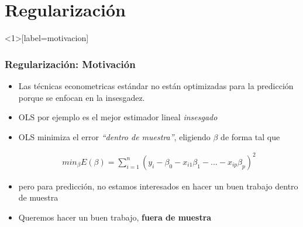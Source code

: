\documentclass[
  shownotes,
  xcolor={svgnames},
  hyperref={colorlinks,citecolor=DarkBlue,linkcolor=andesred,urlcolor=DarkBlue}
  , aspectratio=169]{beamer}
\begin{document}
\section{Regularización}
\begin{frame}<1>[label=motivacion]
\frametitle{Regularización: Motivación}

\begin{itemize}
\item Las técnicas econometricas estándar no están optimizadas para la predicción porque se enfocan en la insesgadez.
\medskip
\item OLS por ejemplo es el mejor estimador lineal {\it insesgado}
\medskip
\item OLS minimiza el error {\it ``dentro de muestra''}, eligiendo $\beta$ de forma tal que 


\begin{align}
min_{\beta} E(\beta) = \sum_{i=1}^n (y_i-\beta_0 - x_{i1}\beta_1 - \dots - x_{ip}\beta_p)^2 
\end{align}

\pause
\item pero para predicción, no estamos interesados en hacer un buen trabajo dentro de muestra 
\medskip
\item Queremos hacer un buen trabajo, {\bf fuera de muestra}
\end{itemize}
\end{frame}
\end{document}
